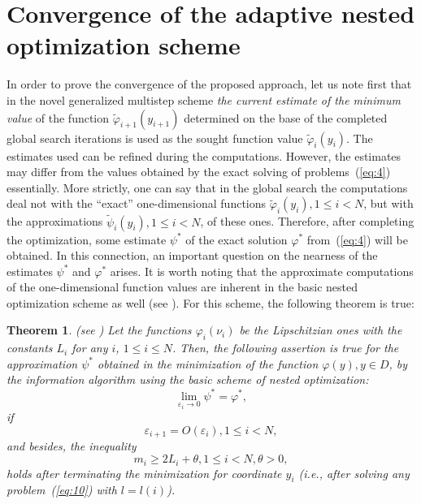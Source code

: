 \documentclass[smallextended]{svjour3}
\let\origref\ref
\renewcommand{\ref}[1]{(\origref{#1})}
\begin{document}
\section{Convergence of the adaptive nested optimization scheme}
\label{sec:3}
In order to prove the convergence of the proposed approach, let us note first that in the novel generalized multistep scheme \textit{the current estimate of the minimum value} of the function $\widetilde{\varphi}_{i + 1}(y_{i + 1})$ determined on the base of the completed global search iterations is used as the sought function value $\widetilde{\varphi}_i(y_i)$. The estimates used can be refined during the computations. However, the estimates may differ from the values obtained by the exact solving of problems~\ref{eq:4} essentially. More strictly, one can say that in the global search the computations deal not with the ``exact'' one-dimensional functions $\widetilde{\varphi}_i(y_i), 1 \leq i < N$, but with the approximations $\widetilde{\psi}_i(y_i), 1 \leq i < N$, of these ones. Therefore, after completing the optimization, some estimate $\psi^*$ of the exact solution $\varphi^*$ from~\ref{eq:4} will be obtained. In this connection, an important question on the nearness of the estimates $\psi^*$ and $\varphi^*$ arises. It is worth noting that the approximate computations of the one-dimensional function values are inherent in the basic nested optimization scheme as well (see \cite{Ref34, Ref35}). For this scheme, the following theorem is true:

\newtheorem{mytheorem}{Theorem}
\begin{mytheorem}
\label{th:1}
(see \cite{Ref34}) Let the functions $\varphi_i(\nu_i)$ be the Lipschitzian ones with the constants $L_i$ for any $i$, $1 \leq i \leq N$. Then, the following assertion is true for the approximation $\psi^*$ obtained in the minimization of the function $\varphi(y), y \in D$, by the information algorithm using the basic scheme of nested optimization:
\begin{equation*}
\lim_{\varepsilon_i \to 0} \psi^* = \varphi^*,
\end{equation*}
if
\begin{equation*}
\varepsilon_{i + 1} = O(\varepsilon_i), 1 \leq i < N,
\end{equation*}
and besides, the inequality
\begin{equation}
\label{eq:20}
m_i \geq 2L_i + \theta, 1 \leq i < N, \theta > 0,
\end{equation}
holds after terminating the minimization for coordinate $y_i$ (i.e., after solving any problem~\ref{eq:10} with $l = l(i)$).
\end{mytheorem}
\end{document}
